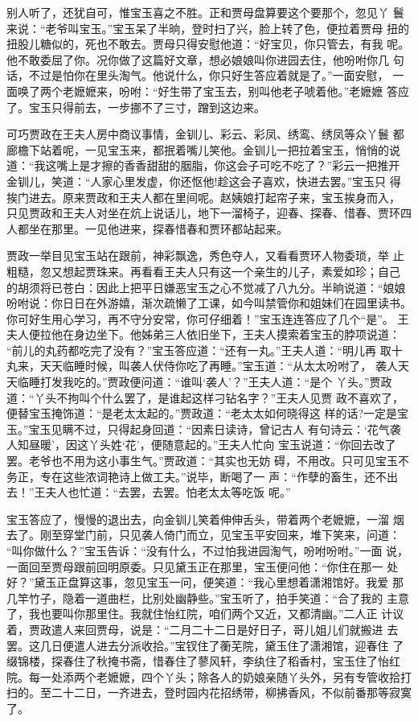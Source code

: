 别人听了，还犹自可，惟宝玉喜之不胜。正和贾母盘算要这个要那个，忽见丫
鬟来说：“老爷叫宝玉。”宝玉呆了半晌，登时扫了兴，脸上转了色，便拉着贾母
扭的扭股儿糖似的，死也不敢去。贾母只得安慰他道：“好宝贝，你只管去，有我
呢。他不敢委屈了你。况你做了这篇好文章，想必娘娘叫你进园去住，他吩咐你几
句话，不过是怕你在里头淘气。他说什么，你只好生答应着就是了。”一面安慰，
一面唤了两个老嬷嬷来，吩咐：“好生带了宝玉去，别叫他老子唬着他。”老嬷嬷
答应了。宝玉只得前去，一步挪不了三寸，蹭到这边来。

可巧贾政在王夫人房中商议事情，金钏儿、彩云、彩凤、绣鸾、绣凤等众丫鬟
都廊檐下站着呢，一见宝玉来，都抿着嘴儿笑他。金钏儿一把拉着宝玉，悄悄的说
道：“我这嘴上是才擦的香香甜甜的胭脂，你这会子可吃不吃了？”彩云一把推开
金钏儿，笑道：“人家心里发虚，你还怄他!趁这会子喜欢，快进去罢。”宝玉只
得挨门进去。原来贾政和王夫人都在里间呢。赵姨娘打起帘子来，宝玉挨身而入，
只见贾政和王夫人对坐在炕上说话儿，地下一溜椅子，迎春、探春、惜春、贾环四
人都坐在那里。一见他进来，探春惜春和贾环都站起来。

贾政一举目见宝玉站在跟前，神彩飘逸，秀色夺人，又看看贾环人物委琐，举
止粗糙，忽又想起贾珠来。再看看王夫人只有这一个亲生的儿子，素爱如珍；自己
的胡须将已苍白：因此上把平日嫌恶宝玉之心不觉减了八九分。半晌说道：“娘娘
吩咐说：你日日在外游嬉，渐次疏懒了工课，如今叫禁管你和姐妹们在园里读书。
你可好生用心学习，再不守分安常，你可仔细着！”宝玉连连答应了几个“是”。
王夫人便拉他在身边坐下。他姊弟三人依旧坐下，王夫人摸索着宝玉的脖项说道：
“前儿的丸药都吃完了没有？”宝玉答应道：“还有一丸。”王夫人道：“明儿再
取十丸来，天天临睡时候，叫袭人伏侍你吃了再睡。”宝玉道：“从太太吩咐了，
袭人天天临睡打发我吃的。”贾政便问道：“谁叫‘袭人’？”王夫人道：“是个
丫头。”贾政道：“丫头不拘叫个什么罢了，是谁起这样刁钻名字？”王夫人见贾
政不喜欢了，便替宝玉掩饰道：“是老太太起的。”贾政道：“老太太如何晓得这
样的话?一定是宝玉。”宝玉见瞒不过，只得起身回道：“因素日读诗，曾记古人
有句诗云：‘花气袭人知昼暖’，因这丫头姓‘花’，便随意起的。”王夫人忙向
宝玉说道：“你回去改了罢。老爷也不用为这小事生气。”贾政道：“其实也无妨
碍，不用改。只可见宝玉不务正，专在这些浓词艳诗上做工夫。”说毕，断喝了一
声：“作孽的畜生，还不出去！”王夫人也忙道：“去罢，去罢。怕老太太等吃饭
呢。”

宝玉答应了，慢慢的退出去，向金钏儿笑着伸伸舌头，带着两个老嬷嬷，一溜
烟去了。刚至穿堂门前，只见袭人倚门而立，见宝玉平安回来，堆下笑来，问道：
“叫你做什么？”宝玉告诉：“没有什么，不过怕我进园淘气，吩咐吩咐。”一面
说，一面回至贾母跟前回明原委。只见黛玉正在那里，宝玉便问他：“你住在那一
处好？”黛玉正盘算这事，忽见宝玉一问，便笑道：“我心里想着潇湘馆好。我爱
那几竿竹子，隐着一道曲栏，比别处幽静些。”宝玉听了，拍手笑道：“合了我的
主意了，我也要叫你那里住。我就住怡红院，咱们两个又近，又都清幽。”二人正
计议着，贾政遣人来回贾母，说是：“二月二十二日是好日子，哥儿姐儿们就搬进
去罢。这几日便遣人进去分派收拾。”宝钗住了蘅芜院，黛玉住了潇湘馆，迎春住
了缀锦楼，探春住了秋掩书斋，惜春住了蓼风轩，李纨住了稻香村，宝玉住了怡红
院。每一处添两个老嬷嬷，四个丫头；除各人的奶娘亲随丫头外，另有专管收拾打
扫的。至二十二日，一齐进去，登时园内花招绣带，柳拂香风，不似前番那等寂寞
了。

